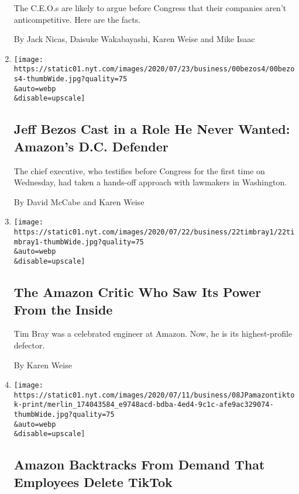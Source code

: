 \begin{enumerate}
  The C.E.O.s are likely to argue before Congress that their companies
  aren't anticompetitive. Here are the facts.

  By Jack Nicas, Daisuke Wakabayashi, Karen Weise and Mike Isaac
\item
  \href{/2020/07/27/business/jeff-bezos-amazon-congress.html}{}

  \texttt{[image: https://static01.nyt.com/images/2020/07/23/business/00bezos4/00bezos4-thumbWide.jpg?quality=75\\\&auto=webp\\\&disable=upscale]}

  \hypertarget{jeff-bezos-cast-in-a-role-he-never-wanted-amazons-dc-defender}{%
  \subsection{Jeff Bezos Cast in a Role He Never Wanted: Amazon's D.C.
  Defender}\label{jeff-bezos-cast-in-a-role-he-never-wanted-amazons-dc-defender}}

  The chief executive, who testifies before Congress for the first time
  on Wednesday, had taken a hands-off approach with lawmakers in
  Washington.

  By David McCabe and Karen Weise
\item
  \href{/2020/07/22/technology/amazon-critic-tim-bray.html}{}

  \texttt{[image: https://static01.nyt.com/images/2020/07/22/business/22timbray1/22timbray1-thumbWide.jpg?quality=75\\\&auto=webp\\\&disable=upscale]}

  \hypertarget{the-amazon-critic-who-saw-its-power-from-the-inside}{%
  \subsection{The Amazon Critic Who Saw Its Power From the
  Inside}\label{the-amazon-critic-who-saw-its-power-from-the-inside}}

  Tim Bray was a celebrated engineer at Amazon. Now, he is its
  highest-profile defector.

  By Karen Weise
\item
  \href{/2020/07/10/technology/tiktok-amazon-security-risk.html}{}

  \texttt{[image: https://static01.nyt.com/images/2020/07/11/business/08JPamazontiktok-print/merlin\_174043584\_e9748acd-bdba-4ed4-9c1c-afe9ac329074-thumbWide.jpg?quality=75\\\&auto=webp\\\&disable=upscale]}

  \hypertarget{amazon-backtracks-from-demand-that-employees-delete-tiktok}{%
  \subsection{Amazon Backtracks From Demand That Employees Delete
  TikTok}\label{amazon-backtracks-from-demand-that-employees-delete-tiktok}}


\end{enumerate}
